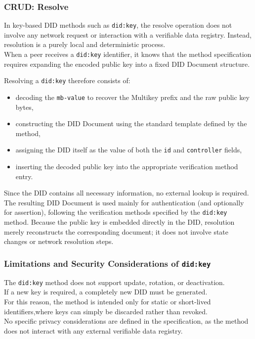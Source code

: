 \subsubsection*{CRUD: Resolve}

In key-based DID methods such as \texttt{did:key}, the resolve operation does not involve any network request or interaction with a verifiable data registry. Instead, resolution is a purely local and deterministic process.\\
When a peer receives a \texttt{did:key} identifier, it knows that the method specification requires expanding the encoded public key into a fixed DID Document structure.
\medskip

\noindent
Resolving a \texttt{did:key} therefore consists of:
\begin{itemize}
    \item decoding the \texttt{mb-value} to recover the Multikey prefix and the raw public key bytes,
    \item constructing the DID Document using the standard template defined by the method,
    \item assigning the DID itself as the value of both the \texttt{id} and \texttt{controller} fields,
    \item inserting the decoded public key into the appropriate verification method entry.
\end{itemize}

\noindent
Since the DID contains all necessary information, no external lookup is required. The resulting DID Document is used mainly for authentication (and optionally for assertion), following the verification methods specified by the \texttt{did:key} method. Because the public key is embedded directly in the DID, resolution merely reconstructs the corresponding document; it does not involve state changes or network resolution steps.

\subsubsection *{Limitations and Security Considerations of \texttt{did:key}}
The \texttt{did:key} method does not support update, rotation, or deactivation.\\
If a new key is required, a completely new DID must be generated.\\  
For this reason, the method is intended only for static or short-lived identifiers,where keys can simply be discarded rather than revoked.\\  
No specific privacy considerations are defined in the specification, as the method does not interact with any external verifiable data registry.
\vspace{1 cm}

